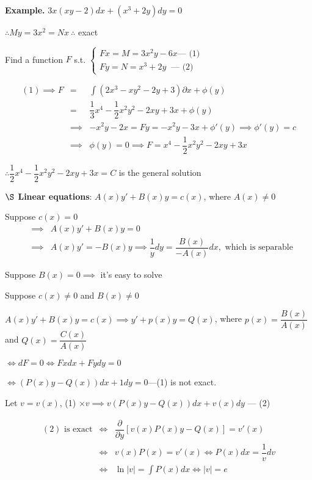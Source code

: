 \textbf{Example.} $3x(xy - 2)dx + (x^3 + 2y)dy = 0$

\begin{solution}
	$\therefore My = 3x^2 = Nx ~\therefore$ exact
	
	Find a function $F$ s.t. $\begin{cases}
		Fx = M = 3x^2y - 6x \text{--- (1)}\\
		Fy = N = x^3 + 2y ~\text{   --- (2)}
	\end{cases}$ 
	
	\begin{eqnarray*}
		(1) \implies F &=& \int (2x^3 - xy^2 - 2y + 3) \partial x + \phi (y)\\
		&=& \dfrac{1}{3}x^4 - \dfrac{1}{2}x^2y^2 - 2xy + 3x + \phi(y)\\
		&\implies& -x^2y-2x=Fy = -x^2y - 3x + \phi'(y) \implies \phi'(y) = c\\
		&\implies& \phi (y) = 0 \implies F = x^4 - \dfrac{1}{2}x^2y^2 - 2xy + 3x
	\end{eqnarray*}
	
	$\therefore \dfrac{1}{2}x^4 - \dfrac{1}{2}x^2y^2 - 2xy + 3x = C$ is the general solution
\end{solution}

\textbf{$\S$ Linear equations}: $A(x)y' + B(x)y = c(x)$, where $A(x) \neq 0$


Suppose $c(x) = 0$
\begin{eqnarray*}
	&\implies& A(x)y' + B(x)y = 0\\
	&\implies& A(x)y' = -B(x)y \implies \dfrac{1}{y}dy = \dfrac{B(x)}{-A(x)}dx, \text{ which is separable}
\end{eqnarray*}

Suppose $B(x) = 0 \implies$ it's easy to solve

Suppose $c(x) \neq 0$ and $B(x) \neq 0$

$A(x)y' + B(x)y = c(x) \implies y' + p(x)y = Q(x)$, where $p(x) = \dfrac{B(x)}{A(x)}$ and $Q(x) = \dfrac{C(x)}{A(x)}$

$\Leftrightarrow dF = 0 \Leftrightarrow Fxdx + Fydy = 0$

$\Leftrightarrow (P(x)y - Q(x))dx + 1dy = 0$---(1) is not exact.

Let $v = v(x)$, (1) $\times v \implies v(P(x)y - Q(x))dx + v(x)dy$ --- (2)

\begin{eqnarray*}
	(2) \text{ is exact} &\Leftrightarrow& \dfrac{\partial}{\partial y} \left[ v(x)P(x)y - Q(x)\right] = v'(x)\\
	&\Leftrightarrow& v(x)P(x) = v'(x) \Leftrightarrow P(x)dx = \dfrac{1}{v}dv\\
	&\Leftrightarrow& \ln|v| = \int P(x)dx \Leftrightarrow |v| = e
\end{eqnarray*}

